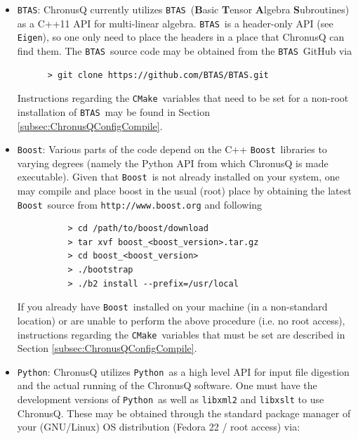 \documentclass[12pt]{article}
\newcommand{\CMake}{\texttt{CMake}}
\newcommand{\Eigen}{\texttt{Eigen}}
\newcommand{\BTAS}{\texttt{BTAS}}
\newcommand{\Boost}{\texttt{Boost}}
\newcommand{\Python}{\texttt{Python}}
\begin{document}
\begin{itemize}
	\begin{lstlisting}
	  > sudo dnf install eigen3-devel
	\end{lstlisting}
        If for some reason you are unable to obtain a pre-packaged version, 
	installation of \Eigen~is quite easy as it is a header-only library. One
	need simply download the source tar file from 
	\texttt{http://http://eigen.tuxfamily.org/} and place the contents somewhere
	that ChronusQ can find them. An explanation of the \CMake~variables that
	need to be set for a non-standard installation of \Eigen~can be found
	in Section \ref{subsec:ChronusQConfigCompile}.

      \item \BTAS: ChronusQ currently utilizes \BTAS~(\textbf{B}asic \textbf{T}ensor
        \textbf{A}lgebra \textbf{S}ubroutines) as a C++11 API for multi-linear 
	algebra. \BTAS~is a header-only API (see \Eigen), so one only need to place
	the headers in a place that ChronusQ can find them. The \BTAS~source code
	may be obtained from the \BTAS~GitHub via

	\begin{lstlisting}
	  > git clone https://github.com/BTAS/BTAS.git
	\end{lstlisting}
	Instructions regarding the \CMake~variables that need to be set for a 
	non-root installation of \BTAS~may be found in Section 
	\ref{subsec:ChronusQConfigCompile}.

      \item \Boost: Various parts of the code depend on the C++ \Boost~libraries to
        varying degrees (namely the Python API from which ChronusQ is made 
	executable). Given that \Boost~is not already installed on your system,
	one may compile and place boost in the usual (root) place by obtaining
	the latest \Boost~source from \texttt{http://www.boost.org} and following

        \begin{lstlisting}
          > cd /path/to/boost/download
          > tar xvf boost_<boost_version>.tar.gz
          > cd boost_<boost_version>
          > ./bootstrap
          > ./b2 install --prefix=/usr/local
        \end{lstlisting}
	If you already have \Boost~installed on your machine (in a non-standard
	location) or are unable to perform the above procedure (i.e. no root 
	access), instructions regarding the \CMake~variables that must be set are 
	described in Section \ref{subsec:ChronusQConfigCompile}.

      \item \Python: ChronusQ utilizes \Python~as a high level API for input
        file digestion and the actual running of the ChronusQ software. One
	must have the development versions of \Python~as well as \texttt{libxml2} 
	and \texttt{libxslt} to use ChronusQ. These may be obtained through the 
	standard package manager of your (GNU/Linux) OS distribution (Fedora 22 /
	root access) via:


\end{itemize}
\end{document}

